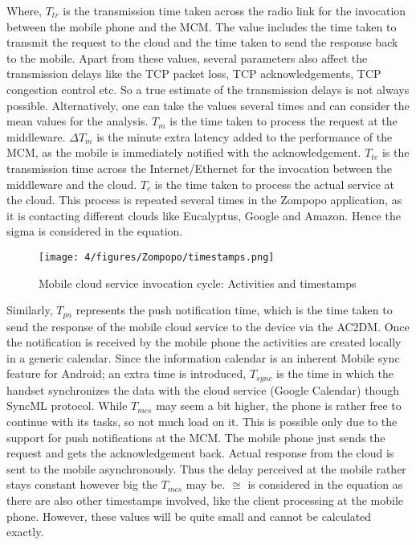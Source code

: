 Where, $T_{tr}$ is the transmission time taken across the radio link for the invocation between the mobile phone and the MCM. The value includes the time taken to transmit the request to the cloud and the time taken to send the response back to the mobile. Apart from these values, several parameters also affect the transmission delays like the TCP packet loss, TCP acknowledgements, TCP congestion control etc. So a true estimate of the transmission delays is not always possible. Alternatively, one can take the values several times and can consider the mean values for the analysis. $T_m$ is the time taken to process the request at the middleware. $\Delta T_m$ is the minute extra latency added to the performance of the MCM, as the mobile is immediately notified with the acknowledgement. $T_{te}$ is the transmission time across the Internet/Ethernet for the invocation between the middleware and the cloud. $T_c$ is the time taken to process the actual service at the cloud. This process is repeated several times in the Zompopo application, as it is contacting different clouds like Eucalyptus, Google and Amazon. Hence the sigma is considered in the equation.

\begin{figure}
\centering
\texttt{[image: 4/figures/Zompopo/timestamps.png]}
\caption{Mobile cloud service invocation cycle: Activities and timestamps}
\label{fig:timestamps}
\end{figure}

Similarly, $T_{pn}$ represents the push notification time, which is the time taken to send the response of the mobile cloud service to the device via the AC2DM. Once the notification is received by the mobile phone the activities are created locally in a generic calendar. Since the information calendar is an inherent Mobile sync feature for Android; an extra time is introduced, $T_{sync}$ is the time in which the handset synchronizes the data with the cloud service (Google Calendar) though SyncML protocol. While $T_{mcs}$ may seem a bit higher, the phone is rather free to continue with its tasks, so not much load on it. This is possible only due to the support for push notifications at the MCM. The mobile phone just sends the request and gets the acknowledgement back. Actual response from the cloud is sent to the mobile asynchronously. Thus the delay perceived at the mobile rather stays constant however big the $T_{mcs}$ may be. $\cong$ is considered in the equation as there are also other timestamps involved, like the client processing at the mobile phone. However, these values will be quite small and cannot be calculated exactly.

